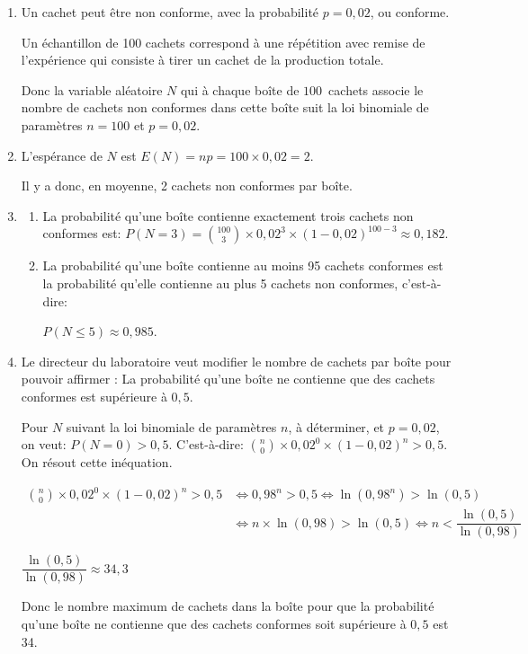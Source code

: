 \documentclass[10pt]{article}
\providecommand{\ds}{\displaystyle}
\begin{document}
\begin{enumerate}
	\item 
Un cachet peut être non conforme, avec la probabilité $p=0,02$, ou conforme.	
	
Un échantillon de 100 cachets correspond à une répétition avec remise de l'expérience qui consiste à tirer un cachet de la production totale.

Donc la variable aléatoire $N$ qui à chaque boîte de $100$~cachets associe le nombre de cachets non conformes dans cette boîte suit  la loi binomiale de paramètres $n=100$ et $p=0,02$.
	
	\item L'espérance de $N$ est $E(N)=np=100\times 0,02 =2$.
	
Il y a donc, en moyenne, 2 cachets non conformes par boîte.
	
	\item 
	\begin{enumerate}
		\item 
La probabilité qu'une boîte contienne exactement trois cachets non conformes est:
$P(N=3)= \binom{100}{3} \times 0,02^3 \times (1-0,02)^{100-3}\approx 0,182$.
		\item La probabilité qu'une boîte contienne au moins 95 cachets conformes est la probabilité qu'elle contienne  au plus 5 cachets non conformes, c'est-à-dire:

$P(N\leqslant 5)\approx 0,985$.
	\end{enumerate}
	\item Le directeur du laboratoire veut modifier le nombre de cachets par boîte pour pouvoir affirmer : \og La probabilité qu'une boîte ne contienne que des cachets conformes est supérieure à $0,5$\fg.
	


Pour $N$ suivant la loi binomiale de paramètres $n$, à déterminer, et $p=0,02$, on veut: $P(N=0) >0,5$. C'est-à-dire:
$\ds\binom{n}{0} \times 0,02^0 \times (1-0,02)^{n} > 0,5$.
On résout cette inéquation.

$\begin{aligned}
\ds\binom{n}{0} \times 0,02^0 \times (1-0,02)^{n} > 0,5
& \iff
0,98^n > 0,5
\iff
\ln \left (0,98^n \right ) > \ln\left (0,5\right )\\
& \iff
n \times \ln \left (0,98 \right ) > \ln\left (0,5\right )
\iff
n < \dfrac{\ln\left (0,5\right )}{\ln \left (0,98 \right )}
\end{aligned}$

$\dfrac{\ln\left (0,5\right )}{\ln \left (0,98 \right )}\approx 34,3$

Donc le nombre maximum de cachets dans la boîte pour que la  probabilité qu'une boîte ne contienne que des cachets conformes soit supérieure à $0,5$ est 34.
\end{enumerate}
\end{document}
